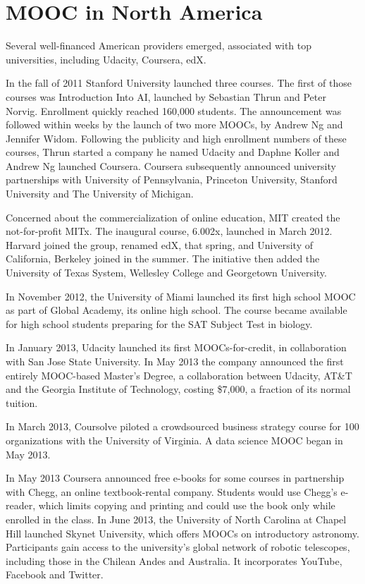 \section{MOOC in North America}
Several well-financed American providers emerged, associated with top
universities, including Udacity, Coursera, edX.

In the fall of 2011 Stanford University launched three courses. The first of
those courses was Introduction Into AI, launched by Sebastian Thrun and Peter
Norvig. Enrollment quickly reached 160,000 students. The announcement was
followed within weeks by the launch of two more MOOCs, by Andrew Ng and Jennifer
Widom. Following the publicity and high enrollment numbers of these courses,
Thrun started a company he named Udacity and Daphne Koller and Andrew Ng
launched Coursera. Coursera subsequently announced university partnerships with
University of Pennsylvania, Princeton University, Stanford University and The
University of Michigan.

Concerned about the commercialization of online education, MIT created the
not-for-profit MITx. The inaugural course, 6.002x, launched in March 2012.
Harvard joined the group, renamed edX, that spring, and University of
California, Berkeley joined in the summer. The initiative then added the
University of Texas System, Wellesley College and Georgetown University.

In November 2012, the University of Miami launched its first high school MOOC as
part of Global Academy, its online high school. The course became available for
high school students preparing for the SAT Subject Test in biology.
\citep{history_of_a_revolution}

In January 2013, Udacity launched its first MOOCs-for-credit, in collaboration
with San Jose State University. In May 2013 the company announced the first
entirely MOOC-based Master's Degree, a collaboration between Udacity, AT\&T and
the Georgia Institute of Technology, costing \$7,000, a fraction of its normal
tuition.

In March 2013, Coursolve piloted a crowdsourced business strategy course for 100
organizations with the University of Virginia. A data science MOOC began in
May 2013.

In May 2013 Coursera announced free e-books for some courses in partnership with
Chegg, an online textbook-rental company. Students would use Chegg's e-reader,
which limits copying and printing and could use the book only while enrolled in
the class. In June 2013, the University of North Carolina at Chapel Hill
launched Skynet University, which offers MOOCs on introductory astronomy.
Participants gain access to the university's global network of robotic
telescopes, including those in the Chilean Andes and Australia. It incorporates
YouTube, Facebook and Twitter.

